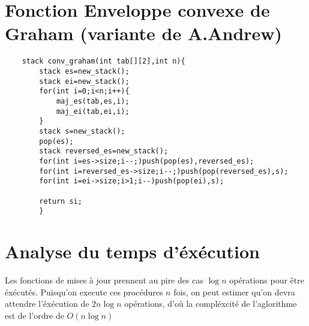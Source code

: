 \documentclass{article}
\begin{document}
\section{Fonction Enveloppe convexe de Graham (variante de A.Andrew)}
\begin{verbatim}
    stack conv_graham(int tab[][2],int n){
        stack es=new_stack();
        stack ei=new_stack();
        for(int i=0;i<n;i++){
            maj_es(tab,es,i);
            maj_ei(tab,ei,i);
        }
        stack s=new_stack();
        pop(es);
        stack reversed_es=new_stack();
        for(int i=es->size;i--;)push(pop(es),reversed_es);
        for(int i=reversed_es->size;i--;)push(pop(reversed_es),s);
        for(int i=ei->size;i>1;i--)push(pop(ei),s);

        return si;
        }
\end{verbatim}
\section{Analyse du temps d'éxécution}
Les fonctions de mises à jour prennent au pire des cas $\log n$ opérations pour être éxécutés.
Puisqu'on execute ces procédures $n$ fois, on peut estimer qu'on devra attendre l'éxécution de $2n\log n$ opérations, d'où la compléxcité de l'aglorithme est de l'ordre de $O(n\log n)$
\end{document}
